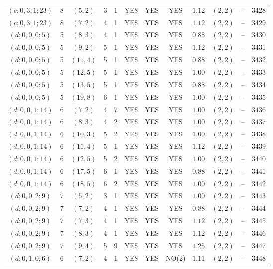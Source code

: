 \begin{longtable}{|c|c|c|c|c|c|c|c|c|c|c|c|}
$(c;0,3,1;23)$ & 8 & $(5,2)$ & 3 & 1 & YES & YES & YES & $1.12$ & $(2,2)$ & -- & 3428\\
$(c;0,3,1;23)$ & 8 & $(7,2)$ & 4 & 1 & YES & YES & YES & $1.12$ & $(2,2)$ & -- & 3429\\
$(d;0,0,0;5)$ & 5 & $(8,3)$ & 4 & 1 & YES & YES & YES & $0.88$ & $(2,2)$ & -- & 3430\\
$(d;0,0,0;5)$ & 5 & $(9,2)$ & 5 & 1 & YES & YES & YES & $1.12$ & $(2,2)$ & -- & 3431\\
$(d;0,0,0;5)$ & 5 & $(11,4)$ & 5 & 1 & YES & YES & YES & $0.88$ & $(2,2)$ & -- & 3432\\
$(d;0,0,0;5)$ & 5 & $(12,5)$ & 5 & 1 & YES & YES & YES & $1.00$ & $(2,2)$ & -- & 3433\\
$(d;0,0,0;5)$ & 5 & $(13,5)$ & 5 & 1 & YES & YES & YES & $0.88$ & $(2,2)$ & -- & 3434\\
$(d;0,0,0;5)$ & 5 & $(19,8)$ & 6 & 1 & YES & YES & YES & $1.00$ & $(2,2)$ & -- & 3435\\
$(d;0,0,1;14)$ & 6 & $(7,2)$ & 4 & 7 & YES & YES & YES & $1.00$ & $(2,2)$ & -- & 3436\\
$(d;0,0,1;14)$ & 6 & $(8,3)$ & 4 & 2 & YES & YES & YES & $1.00$ & $(2,2)$ & -- & 3437\\
$(d;0,0,1;14)$ & 6 & $(10,3)$ & 5 & 2 & YES & YES & YES & $1.00$ & $(2,2)$ & -- & 3438\\
$(d;0,0,1;14)$ & 6 & $(11,4)$ & 5 & 1 & YES & YES & YES & $1.12$ & $(2,2)$ & -- & 3439\\
$(d;0,0,1;14)$ & 6 & $(12,5)$ & 5 & 2 & YES & YES & YES & $1.00$ & $(2,2)$ & -- & 3440\\
$(d;0,0,1;14)$ & 6 & $(17,5)$ & 6 & 1 & YES & YES & YES & $0.88$ & $(2,2)$ & -- & 3441\\
$(d;0,0,1;14)$ & 6 & $(18,5)$ & 6 & 2 & YES & YES & YES & $1.00$ & $(2,2)$ & -- & 3442\\
$(d;0,0,2;9)$ & 7 & $(5,2)$ & 3 & 1 & YES & YES & YES & $1.00$ & $(2,2)$ & -- & 3443\\
$(d;0,0,2;9)$ & 7 & $(7,2)$ & 4 & 1 & YES & YES & YES & $0.88$ & $(2,2)$ & -- & 3444\\
$(d;0,0,2;9)$ & 7 & $(7,3)$ & 4 & 1 & YES & YES & YES & $1.12$ & $(2,2)$ & -- & 3445\\
$(d;0,0,2;9)$ & 7 & $(8,3)$ & 4 & 1 & YES & YES & YES & $1.12$ & $(2,2)$ & -- & 3446\\
$(d;0,0,2;9)$ & 7 & $(9,4)$ & 5 & 9 & YES & YES & YES & $1.25$ & $(2,2)$ & -- & 3447\\
$(d;0,1,0;6)$ & 6 & $(7,2)$ & 4 & 1 & YES & YES & NO(2) & $1.11$ & $(2,2)$ & -- & 3448\\

\end{longtable}
